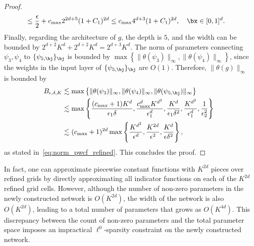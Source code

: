 \documentclass[11pt]{article}
\begin{document}
\begin{proof}
\begin{equation*}
\begin{aligned}
            & \leq \frac{\epsilon}{2} + c_{\max} 2^{2d+5} (1 + C_1)^{ 2d} \leq c_{\max}4^{d+3} (1 + C_1)^{2d}, \quad \bx \in [0,1]^d. 
        \end{aligned}
    \end{equation*}
    Finally, regarding the architecture of $g$, the depth  is $5$, and the width  can be bounded by $2^{d+2}K^d + 2^{d+2} K^d = 2^{d+3} K^d$. The norm of parameters connecting $\psi_3, \psi_4$ to $ \{\psi_{5,\bj}\}_{\bj}$ is bounded by $\max \left\{ \|\theta(\psi_3)\|_{\infty}, \|\theta(\psi_4)\|_{\infty}\right\}$, since the weights in the input layer of $\{\psi_{5,\bj}\}_{\bj}$ are $O(1)$. Therefore, $\|\theta(g)\|_{\infty}$ is bounded by 
    \begin{equation*}
        \begin{aligned}
             B_{\epsilon,\delta, K} & \lesssim \max \left\{ \|\theta(\psi_3)\|_{\infty}, \|\theta(\psi_4)\|_{\infty},  \|\theta(\psi_{5,\bj})\|_{\infty}\right\}\\
             &\lesssim \max\left\{ \frac{(c_{\max}+1) K^d}{\epsilon_1 \delta}, \frac{c_{\max}^d K^{d^2}}{\epsilon_1^d}, \frac{K^d}{\epsilon_1\delta^2}, \frac{K^{d^2}}{\epsilon_1^d}, \frac{1}{\epsilon_2^2} \right\}\\
             &\lesssim (c_{\max}+ 1)^{2d} \max \left\{ \frac{K^{d^2}}{\epsilon^d}, \frac{K^{2d}}{\epsilon^{2}}, \frac{K^d}{\epsilon \delta^2} \right\},
        \end{aligned}
    \end{equation*}
    as stated in~\eqref{eq:norm_pwcf_refined}. This concludes the proof.
\end{proof}

\begin{remark}
    In fact, one can approximate piecewise constant functions with $K^{2d}$ pieces over refined grids by directly approximating all indicator functions on each of the $K^{2d}$ refined grid cells. However, although the number of non-zero parameters in the newly constructed network is $O(K^{2d})$, the width of the network is also $O(K^{2d})$, leading to a total number of parameters that grows as $O(K^{4d})$. This discrepancy between the count of non-zero parameters and the total parameter space imposes an impractical $\ell^0$-sparsity constraint on the newly constructed network.
\end{remark}
\end{document}
